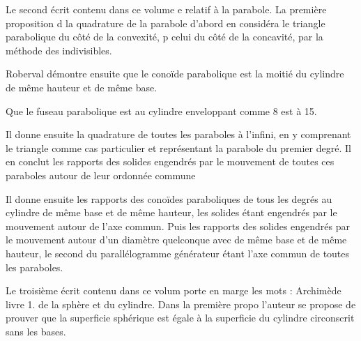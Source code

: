 \documentclass[11pt,a4paper]{article}
\begin{document}
Le second écrit contenu dans ce volume e
relatif à la parabole. La première proposition d\ill{} la quadrature de la parabole d'abord en considéra le triangle parabolique du côté de la convexité, p\ill{} celui du côté de la concavité, par la méthode des indivisibles.

Roberval démontre ensuite que le conoïde parabolique est la moitié du cylindre de même hauteur et de même base.

Que le fuseau parabolique est au cylindre enveloppant comme 8 est à 15.

Il donne ensuite la quadrature de toutes les paraboles à l'infini, en y comprenant le triangle comme cas particulier et représentant la parabole du premier
degré. Il en conclut les rapports des solides engendrés par le mouvement de toutes ces paraboles autour de leur ordonnée commune

Il donne ensuite les rapports des conoïdes paraboliques de tous les degrés au cylindre de même base et de même hauteur, les solides étant engendrés par le mouvement autour de l'axe commun. Puis les rapports des solides
engendrés par le mouvement autour d'un diamètre quelconque avec  de même base et de même hauteur, le second \ill{} du parallélogramme générateur étant l'axe commun de toutes les paraboles.


Le troisième écrit contenu dans ce volum porte en marge les mots : Archimède livre 1. de la sphère et du cylindre. Dans la première propo\ill{} l'auteur se propose de prouver que la superficie \ill{} sphérique est égale à la superficie du cylindre circonscrit sans les bases.
\end{document}
